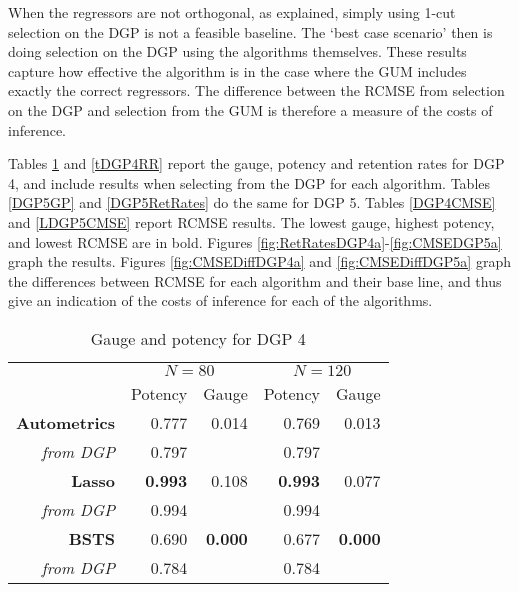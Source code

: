When the regressors are not orthogonal, as explained, simply using 1-cut selection on the DGP is not a feasible baseline. The `best case scenario' then is doing selection on the DGP using the algorithms themselves. These results capture how effective the algorithm is in the case where the GUM includes exactly the correct regressors. The difference between the RCMSE from selection on the DGP and selection from the GUM is therefore a measure of the costs of inference. 





Tables \ref{DGP4GP} and \ref{tDGP4RR} report the gauge, potency and retention rates for DGP 4, and include results when selecting from the DGP for each algorithm. Tables \ref{DGP5GP} and \ref{DGP5RetRates} do the same for DGP 5. Tables \ref{DGP4CMSE} and \ref{LDGP5CMSE} report RCMSE results. The lowest gauge, highest potency, and lowest RCMSE are in bold. Figures \ref{fig:RetRatesDGP4a}-\ref{fig:CMSEDGP5a} graph the results. Figures \ref{fig:CMSEDiffDGP4a} and \ref{fig:CMSEDiffDGP5a} graph the differences between RCMSE for each algorithm and their base line, and thus give an indication of the costs of inference for each of the algorithms.
\begin{table}[h]
  \centering
\begin{tabular}{r|r|r|r|r}

         & \multicolumn{2}{|c|}{\textbf{$N=80$}} & \multicolumn{2}{|c}{\textbf{$N=120$}} \\
            & Potency           & Gauge           & Potency            & Gauge           \\
          \hline
    \textbf{Autometrics} & 0.777 & 0.014 & 0.769 & 0.013 \\
    \textit{from DGP} & 0.797 &       & 0.797 &  \\
    \hline
    \textbf{Lasso} & \textbf{0.993} & 0.108 & \textbf{0.993} & 0.077 \\
    \textit{from DGP} & 0.994 &       & 0.994 &  \\
    \hline
    \textbf{BSTS} & 0.690 & \textbf{0.000} & 0.677 & \textbf{0.000} \\
    \textit{from DGP} & 0.784 &       & 0.784 &  \\

    \end{tabular}%
      \caption{Gauge and potency for DGP 4}
  \label{DGP4GP}%
  
\end{table}%
